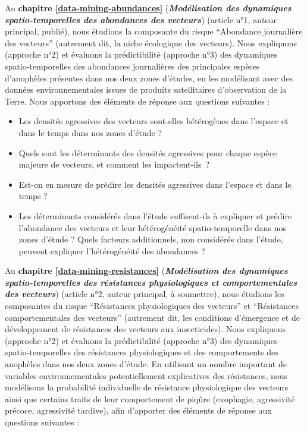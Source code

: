 \documentclass[12pt,twoside]{reedthesis}
\providecommand{\tightlist}{%
  \setlength{\itemsep}{0pt}\setlength{\parskip}{0pt}}
\begin{document}
Au \textbf{chapitre \ref{data-mining-abundances}} (\textbf{\emph{Modélisation des dynamiques spatio-temporelles des abondances des vecteurs}}) (article n°1, auteur principal, publié), nous étudions la composante du risque ``Abondance journalière des vecteurs'' (autrement dit, la niche écologique des vecteurs). Nous expliquons (approche n°2) et évaluons la prédictibilité (approche n°3) des dynamiques spatio-temporelles des abondances journalières des principales espèces d'anophèles présentes dans nos deux zones d'études, en les modélisant avec des données environnementales issues de produits satellitaires d'observation de la Terre. Nous apportons des éléments de réponse aux questions suivantes :
\begin{itemize}
\tightlist
\item
  Les densités agressives des vecteurs sont-elles hétérogènes dans l'espace et dans le temps dans nos zones d'étude ?
\item
  Quels sont les déterminants des densités agressives pour chaque espèce majeure de vecteurs, et comment les impactent-ils~?
\item
  Est-on en mesure de prédire les densités agressives dans l'espace et dans le temps ?
\item
  Les déterminants considérés dans l'étude suffisent-ils à expliquer et prédire l'abondance des vecteurs et leur hétérogénéité spatio-temporelle dans nos zones d'étude ? Quels facteurs additionnels, non considérés dans l'étude, peuvent expliquer l'hétérogénéité des abondances ?\\
\end{itemize}
Au \textbf{chapitre \ref{data-mining-resistances}} (\textbf{\emph{Modélisation des dynamiques spatio-temporelles des résistances physiologiques et comportementales des vecteurs}}) (article n°2, auteur principal, à soumettre), nous étudions les composantes du risque ``Résistances physiologiques des vecteurs'' et ``Résistances comportementales des vecteurs'' (autrement dit, les conditions d'émergence et de développement de résistances des vecteurs aux insecticides). Nous expliquons (approche n°2) et évaluons la prédictibilité (approche n°3) des dynamiques spatio-temporelles des résistances physiologiques et des comportements des anophèles dans nos deux zones d'étude. En utilisant un nombre important de variables environnementales potentiellement explicatives des résistances, nous modélisons la probabilité individuelle de résistance physiologique des vecteurs ainsi que certains traits de leur comportement de piqûre (exophagie, agressivité précoce, agressivité tardive), afin d'apporter des éléments de réponse aux questions suivantes :
\end{document}
